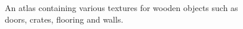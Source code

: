 \documentclass[12pt]{CPP}
\begin{document}
\begin{figure}[!htbp]
\begin{center}
\caption{An atlas containing various textures for wooden objects such as doors, crates, flooring and walls.}
\end{center}
\end{figure}
\end{document}
